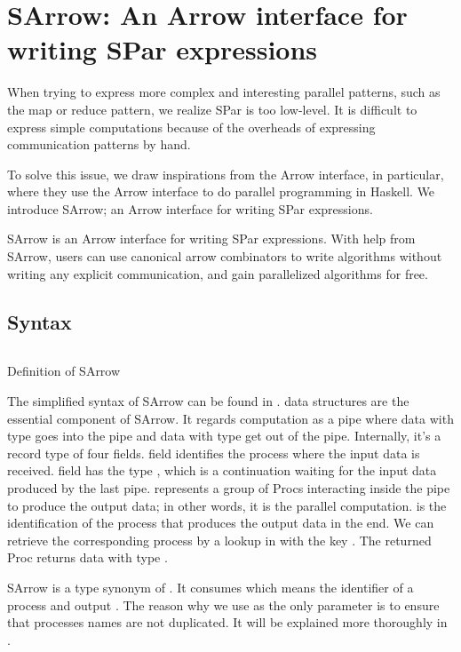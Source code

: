 \chapter{SArrow: An Arrow interface for writing SPar expressions} \label{chap:arrow}
When trying to express more complex and interesting parallel patterns, such as the map or reduce pattern, we realize SPar is too low-level. It is difficult to express simple computations because of the overheads of expressing communication patterns by hand. 

To solve this issue, we draw inspirations from the Arrow interface, in particular, \cite{braunArrowsParallelComputation2018} where they use the Arrow interface to do parallel programming in Haskell. We introduce SArrow; an Arrow interface for writing SPar expressions.

SArrow is an Arrow interface for writing SPar expressions. With help from SArrow, users can use canonical arrow combinators to write algorithms without writing any explicit communication, and gain parallelized algorithms for free.

\section{Syntax}
\begin{listing}[ht]
\inputminted{Haskell}{arrow/def.hs} 
\caption{Definition of SArrow}
\label{SArrow:def}
\end{listing}
The simplified syntax of SArrow can be found in .  data structures are the essential component of SArrow. It regards computation as a pipe where data with type  goes into the pipe and data with type  get out of the pipe. Internally, it's a record type of four fields.  field identifies the process where the input data is received.  field has the type , which is a continuation waiting for the input data produced by the last pipe.  represents a group of Procs interacting inside the pipe to produce the output data; in other words, it is the parallel computation.  is the identification of the process that produces the output data in the end. We can retrieve the corresponding process by a lookup in  with the key . The returned Proc returns data with type . 

SArrow is a type synonym of . It consumes  which means the identifier of a process and output . The reason why we use  as the only parameter is to ensure that processes names are not duplicated. It will be explained more thoroughly in .
